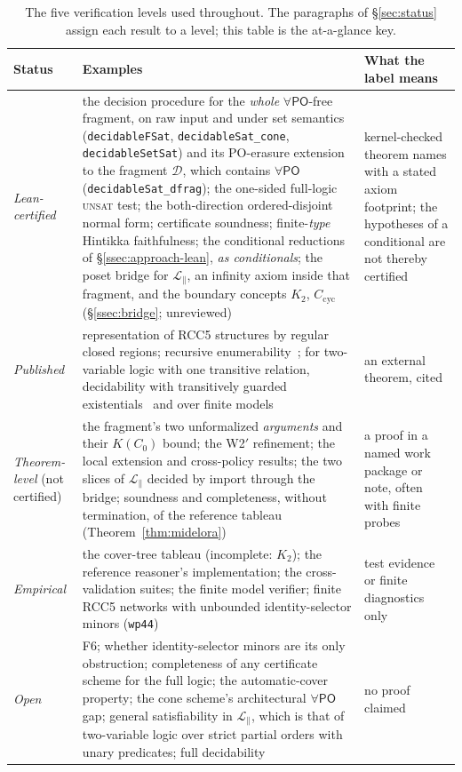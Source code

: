 \documentclass[11pt]{article}
\newcommand{\PO}{\mathsf{PO}}
\newcommand{\code}[1]{\texttt{#1}}
\theoremstyle{plain}
\theoremstyle{definition}
\begin{document}
\begin{table}[!htbp]
\centering
\small
\renewcommand{\arraystretch}{1.25}
\begin{tabular}{@{}L{0.19\textwidth}L{0.45\textwidth}L{0.26\textwidth}@{}}
\toprule
\textbf{Status} & \textbf{Examples} & \textbf{What the label means}\\
\midrule
\emph{Lean-certified} & the decision procedure for the \emph{whole}
$\forall\PO$-free fragment, on raw input and under set semantics
(\code{decidableFSat}, \code{decidableSat\_cone}, \code{decidableSetSat})
and its PO-erasure extension to the fragment $\mathcal D$, which contains
$\forall\PO$ (\code{decidableSat\_dfrag}); the one-sided full-logic
\textsc{unsat} test; the both-direction
ordered-disjoint normal form; certificate soundness; finite-\emph{type}
Hintikka faithfulness; the conditional reductions of
\S\ref{ssec:approach-lean}, \emph{as conditionals}; the poset bridge for
$\mathcal L_{\parallel}$, an infinity axiom inside that fragment, and
the boundary concepts $K_2$, $C_{\mathrm{cyc}}$ (\S\ref{ssec:bridge};
unreviewed) & kernel-checked theorem
names with a stated axiom footprint; the hypotheses of a conditional are not
thereby certified\\
\addlinespace
\emph{Published} & representation of RCC5 structures by regular closed
regions; recursive enumerability~\cite[Thms.~23, 24, 28]{LutzWolter2006};
for two-variable logic with one transitive relation, decidability with
transitively guarded existentials~\cite{SzwastTendera2018} and over finite
models~\cite{PrattHartmann2018} &
an external theorem, cited\\
\addlinespace
\emph{Theorem-level} (not certified) & the fragment's two unformalized
\emph{arguments} and their $K(C_0)$ bound; the W2$'$ refinement; the local
extension and cross-policy results; the two slices of
$\mathcal L_{\parallel}$ decided by import through the bridge; soundness and
completeness, without termination, of the reference tableau
(Theorem~\ref{thm:midelora}) & a proof in a
named work package or note, often with finite probes\\
\addlinespace
\emph{Empirical} & the cover-tree tableau (incomplete: $K_2$); the reference
reasoner's implementation; the cross-validation suites; the
finite model verifier; finite RCC5 networks with unbounded identity-selector
minors (\texttt{wp44}) & test evidence or finite diagnostics only\\
\addlinespace
\emph{Open} & F6; whether identity-selector minors are its only obstruction;
completeness of any certificate scheme for the full logic; the
automatic-cover property; the cone scheme's architectural $\forall\PO$ gap;
general satisfiability in $\mathcal L_{\parallel}$, which is that of
two-variable logic over strict partial orders with unary predicates;
full decidability & no proof claimed\\
\bottomrule
\end{tabular}
\caption{The five verification levels used throughout. The paragraphs of
\S\ref{sec:status} assign each result to a level; this table is the
at-a-glance key.}
\label{tab:status}
\end{table}
\end{document}
